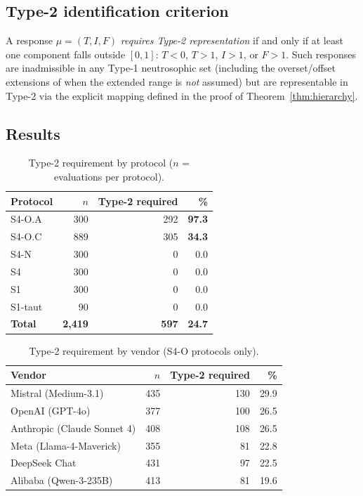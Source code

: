 \documentclass[10pt,a4paper]{article}
\begin{document}
\subsection{Type-2 identification criterion}

A response $\mu = (T, I, F)$ \emph{requires Type-2
representation} if and only if at least one component
falls outside $[0,1]$:
$T < 0$, $T > 1$, $I > 1$, or $F > 1$.
Such responses are inadmissible in any Type-1 neutrosophic
set (including the overset/offset extensions of
\cite{smarandache2016overset} when the extended range
is \emph{not} assumed) but are representable in Type-2
via the explicit mapping defined in the proof of
Theorem~\ref{thm:hierarchy}.

\subsection{Results}

\begin{table}[h!]
\centering
\caption{Type-2 requirement by protocol ($n$ = evaluations per protocol).}
\label{tab:protocol}
\begin{tabular}{lrrr}
\toprule
Protocol & $n$ & Type-2 required & \% \\
\midrule
S4-O.A  & 300 & 292 & \textbf{97.3} \\
S4-O.C  & 889 & 305 & \textbf{34.3} \\
S4-N    & 300 & 0   & 0.0 \\
S4      & 300 & 0   & 0.0 \\
S1      & 300 & 0   & 0.0 \\
S1-taut &  90 & 0   & 0.0 \\
\midrule
\textbf{Total} & \textbf{2,419} & \textbf{597} & \textbf{24.7} \\
\bottomrule
\end{tabular}
\end{table}

\begin{table}[h!]
\centering
\caption{Type-2 requirement by vendor (S4-O protocols only).}
\label{tab:vendor}
\begin{tabular}{lrrr}
\toprule
Vendor & $n$ & Type-2 required & \% \\
\midrule
Mistral (Medium-3.1)         & 435 & 130 & 29.9 \\
OpenAI (GPT-4o)              & 377 & 100 & 26.5 \\
Anthropic (Claude Sonnet 4)  & 408 & 108 & 26.5 \\
Meta (Llama-4-Maverick)      & 355 &  81 & 22.8 \\
DeepSeek Chat                & 431 &  97 & 22.5 \\
Alibaba (Qwen-3-235B)        & 413 &  81 & 19.6 \\
\bottomrule
\end{tabular}
\end{table}
\end{document}
